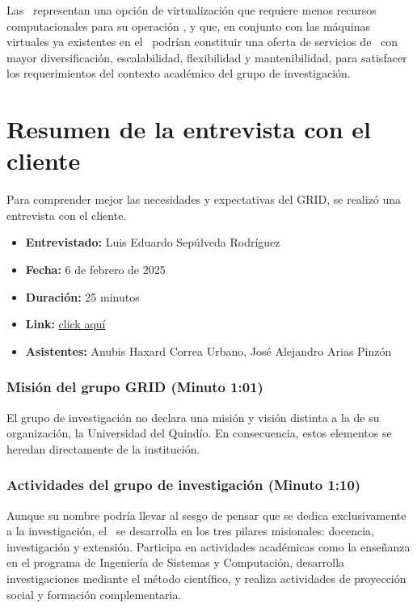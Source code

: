 Las \VBC\ representan una opción de virtualización que requiere menos recursos computacionales para su operación \citep{Xavier2013}, y que, en conjunto con las máquinas virtuales ya existentes en el \GRID\, podrían constituir una oferta de servicios de \TI\ con mayor diversificación, escalabilidad, flexibilidad y mantenibilidad, para satisfacer los requerimientos del contexto académico del grupo de investigación.

\section{Resumen de la entrevista con el cliente}

Para comprender mejor las necesidades y expectativas del GRID, se realizó una entrevista con el cliente.

\begin{itemize}
  \item \textbf{Entrevistado:} Luis Eduardo Sepúlveda Rodríguez
  \item \textbf{Fecha:} 6 de febrero de 2025
  \item \textbf{Duración:} 25 minutos
  \item \textbf{Link:} \href{https://drive.google.com/file/d/1rIc9xOsyDqumlTV-QXcw0inPyIbSEHLz/view?usp=sharing}{click aquí}
  \item \textbf{Asistentes:} Anubis Haxard Correa Urbano, José Alejandro Arias Pinzón
\end{itemize}

\subsubsection{Misión del grupo GRID (Minuto 1:01)}
El grupo de investigación no declara una misión y visión distinta a la de su organización, la Universidad del Quindío. En consecuencia, estos elementos se heredan directamente de la institución.

\subsubsection{Actividades del grupo de investigación (Minuto 1:10)}
Aunque su nombre podría llevar al sesgo de pensar que se dedica exclusivamente a la investigación, el \GRID\ se desarrolla en los tres pilares misionales: docencia, investigación y extensión. Participa en actividades académicas como la enseñanza en el programa de Ingeniería de Sistemas y Computación, desarrolla investigaciones mediante el método científico, y realiza actividades de proyección social y formación complementaria.

